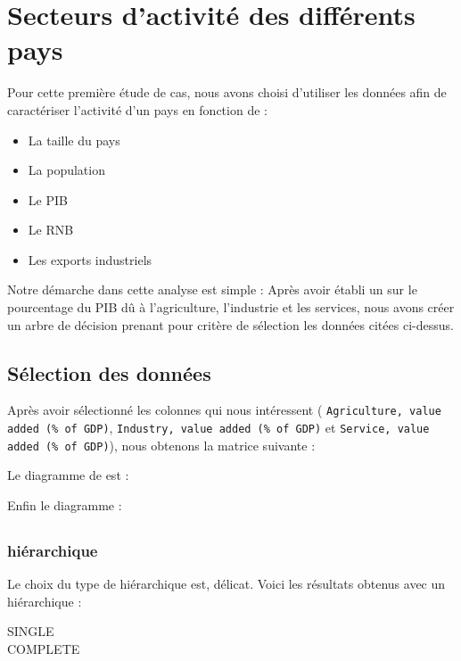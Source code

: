 \newpage
\section{Secteurs d'activité des différents pays}
Pour cette première étude de cas, nous avons choisi d'utiliser les données afin de caractériser l'activité d'un pays en fonction de :
\begin{itemize}
	\item La taille du pays
	\item La population
	\item Le \gls{PIB}
	\item Le \gls{RNB}
	\item Les exports industriels
\end{itemize}

Notre démarche dans cette analyse est simple : Après avoir établi un  sur le pourcentage du \gls{PIB} dû à l'agriculture, l'industrie et les services, nous avons créer un arbre de décision prenant pour critère de sélection les données citées ci-dessus.

\subsection{Sélection des données}
Après avoir sélectionné les colonnes qui nous intéressent ( \ie \texttt{Agriculture, value added (\% of GDP)}, \texttt{Industry, value added (\% of GDP)} et \texttt{Service, value added (\% of GDP)}), nous obtenons la matrice suivante : %

Le diagramme de  est : %

Enfin le diagramme  : 


\subsection{}
\subsubsection{ hiérarchique}
Le choix du type de  hiérarchique est, \apriori délicat. Voici les résultats obtenus avec un  hiérarchique :
\begin{description}
	\item [SINGLE] %
	\item [COMPLETE] %
\end{description}


